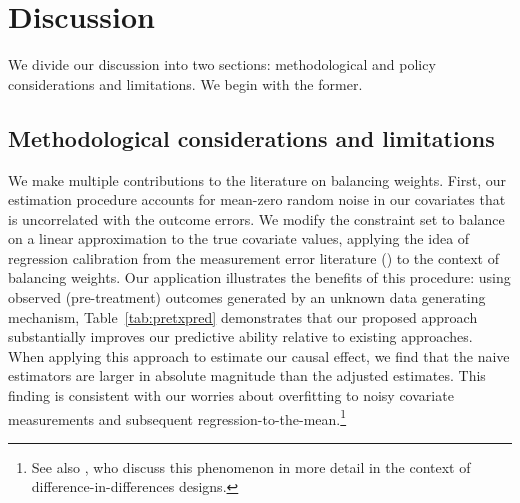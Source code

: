 \documentclass[aoas]{imsart}
\theoremstyle{plain}
\theoremstyle{remark}
\begin{document}
\section{Discussion}

We divide our discussion into two sections: methodological and policy considerations and limitations. We begin with the former.

\subsection{Methodological considerations and limitations}

We make multiple contributions to the literature on balancing weights. First, our estimation procedure accounts for mean-zero random noise in our covariates that is uncorrelated with the outcome errors. We modify the constraint set to balance on a linear approximation to the true covariate values, applying the idea of regression calibration from the measurement error literature (\cite{gleser1992importance}) to the context of balancing weights. Our application illustrates the benefits of this procedure: using observed (pre-treatment) outcomes generated by an unknown data generating mechanism, Table~\ref{tab:pretxpred} demonstrates that our proposed approach substantially improves our predictive ability relative to existing approaches. When applying this approach to estimate our causal effect, we find that the naive estimators are larger in absolute magnitude than the adjusted estimates. This finding is consistent with our worries about overfitting to noisy covariate measurements and subsequent regression-to-the-mean.\footnote{See also \cite{daw2018matching}, who discuss this phenomenon in more detail in the context of difference-in-differences designs.}
\end{document}
